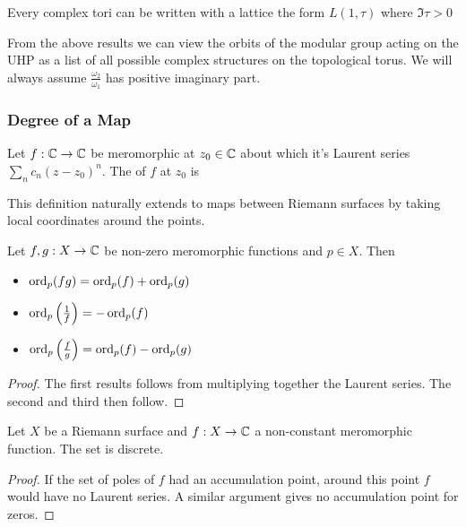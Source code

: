 \documentclass{article}
\begin{document}
\begin{prop}
	Every complex tori can be written with a lattice the form $L(1,\tau)$ where $\Im\tau > 0$
\end{prop}

\begin{remark}
	From the above results we can view the orbits of the modular group acting on the UHP as a list of all possible complex structures on the topological torus. We will always assume $\frac{\omega_2}{\omega_1}$ has positive imaginary part.  
\end{remark}

\subsubsection{Degree of a Map}

\begin{definition}
	Let $f:\mathbb{C} \to \mathbb{C}$ be meromorphic at $z_0 \in \mathbb{C}$ about which it's Laurent series $\sum_n c_n (z-z_0)^n$. The  of $f$ at $z_0$ is 
\end{definition}

\begin{remark}
	This definition naturally extends to maps between Riemann surfaces by taking local coordinates around the points. 
\end{remark}

\begin{lemma}
	Let $f,g : X \to \mathbb{C}$ be non-zero meromorphic functions and $p  \in X$. Then 
	\begin{itemize}
		\item $\operatorname{ord}_p(fg) = \operatorname{ord}_p(f) + \operatorname{ord}_p(g)$
		\item $\operatorname{ord}_p\left( \frac{1}{f} \right) = -\operatorname{ord}_p(f)$
		\item $\operatorname{ord}_p\left( \frac{f}{g} \right) = \operatorname{ord}_p(f) - \operatorname{ord}_p(g)$
	\end{itemize}
\end{lemma}
\begin{proof}
	The first results follows from multiplying together the Laurent series. The second and third then follow. 
\end{proof}

\begin{lemma}
	Let $X$ be a Riemann surface and $f:X \to \mathbb{C}$ a non-constant meromorphic function. The set
is discrete.
\end{lemma}
\begin{proof}
	If the set of poles of $f$ had an accumulation point, around this point $f$ would have no Laurent series. A similar argument gives no accumulation point for zeros. 
\end{proof}
\end{document}
